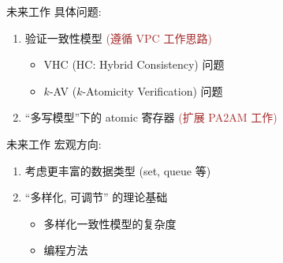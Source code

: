 \begin{frame}{未来工作}
  具体问题:
  \begin{enumerate}
	\setlength{\itemsep}{5pt}
	\item 验证一致性模型 \textcolor{brown}{\small (遵循 VPC 工作思路)}
	  \begin{itemize}
		\item VHC {\small (HC: Hybrid Consistency)} 问题 
		\item $k$-AV {\small ($k$-Atomicity Verification)} 问题 
	  \end{itemize}
	  \pause
	\item ``多写模型''下的 atomic 寄存器 \textcolor{brown}{\small (扩展 PA2AM 工作)}
  \end{enumerate}
\end{frame}
\begin{frame}{未来工作}
  宏观方向:
  \begin{enumerate}
	\setlength{\itemsep}{8pt}
	\item 考虑更丰富的数据类型 {\small (set, queue 等)} 
	\item ``多样化, 可调节'' 的理论基础
	  \begin{itemize}
		\item 多样化一致性模型的复杂度
		\item 编程方法
	  \end{itemize}
  \end{enumerate}
\end{frame}
